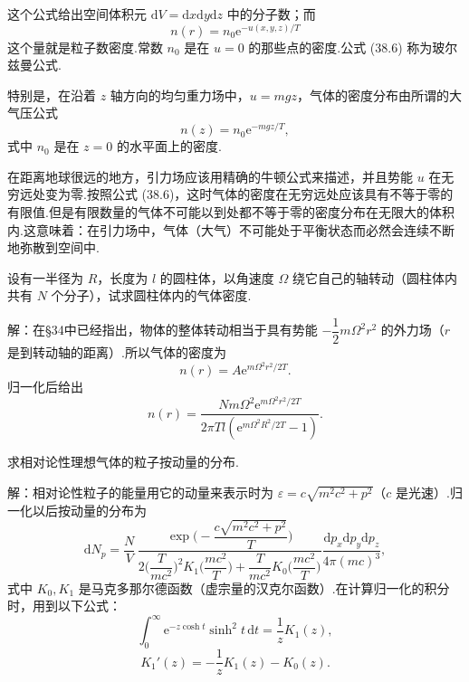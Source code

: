 这个公式给出空间体积元 $\mathrm{d}V=\mathrm{d}x\mathrm{d}y\mathrm{d}z$ 中的分子数；而
\begin{equation}
  n(r)=n_0\mathrm{e}^{-u(x,y,z)/T}
\end{equation}
这个量就是粒子数密度.常数 $n_0$ 是在 $u=0$ 的那些点的密度.公式 (38.6) 称为玻尔兹曼公式.

特别是，在沿着 $z$ 轴方向的均匀重力场中，$u=mgz$，气体的密度分布由所谓的大气压公式
\begin{equation}
  n(z)=n_0\mathrm{e}^{-mgz/T},
\end{equation}
式中 $n_0$ 是在 $z=0$ 的水平面上的密度.

在距离地球很远的地方，引力场应该用精确的牛顿公式来描述，并且势能 $u$ 在无穷远处变为零.按照公式 (38.6)，这时气体的密度在无穷远处应该具有不等于零的有限值.但是有限数量的气体不可能以到处都不等于零的密度分布在无限大的体积内.这意味着：在引力场中，气体（大气）不可能处于平衡状态而必然会连续不断地弥散到空间中.

\begin{xiti}

\quad 设有一半径为 $R$，长度为 $l$ 的圆柱体，以角速度 $\Omega$ 绕它自己的轴转动（圆柱体内共有 $N$ 个分子），试求圆柱体内的气体密度.

解：在§34中已经指出，物体的整体转动相当于具有势能 $-\dfrac{1}{2}m\Omega^2r^2$ 的外力场（$r$ 是到转动轴的距离）.所以气体的密度为
\begin{equation*}
  n(r)=A\mathrm{e}^{m\Omega^2r^2/2T}.
\end{equation*}
归一化后给出
\begin{equation*}
  n(r)=\frac{Nm\Omega^2\mathrm{e}^{m\Omega^2r^2/2T}}
  {2\pi Tl\left(\mathrm{e}^{m\Omega^2R^2/2T}-1\right)}.
\end{equation*}

\quad 求相对论性理想气体的粒子按动量的分布.

解：相对论性粒子的能量用它的动量来表示时为 $\varepsilon=c\sqrt{m^2c^2+p^2}$（$c$ 是光速）.归一化以后按动量的分布为
\begin{equation*}
  \mathrm{d}N_p=\frac{N}{V}\,
  \frac{\exp\Bigg(-\dfrac{c\sqrt{m^2c^2+p^2}}{T}\Bigg)}
  {2\Big(\dfrac{T}{mc^2}\Big)^{2}K_1\Big(\dfrac{mc^2}{T}\Big)
  +\dfrac{T}{mc^2}K_0\Big(\dfrac{mc^2}{T}\Big)}
  \frac{\mathrm{d}p_x\mathrm{d}p_y\mathrm{d}p_z}{4\pi(mc)^3},
\end{equation*}
式中 $K_0,K_1$ 是马克多那尔德函数（虚宗量的汉克尔函数）.在计算归一化的积分时，用到以下公式：
\begin{equation*}
  \int_0^{\infty}\mathrm{e}^{-z\cosh t}\sinh^2 t\,\mathrm{d}t=\frac{1}{z}K_1(z),
\end{equation*}
\begin{equation*}
  K_1'(z)=-\frac{1}{z}K_1(z)-K_0(z).
\end{equation*}

\end{xiti}

